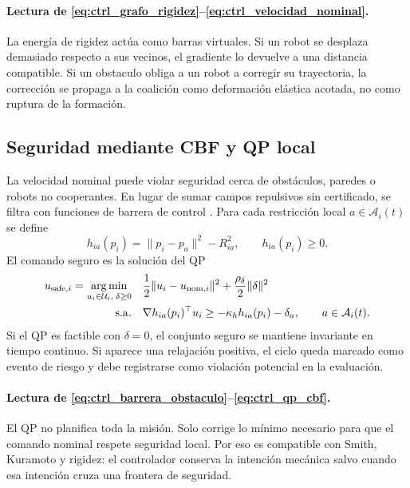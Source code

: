 \paragraph{Lectura de \eqref{eq:ctrl_grafo_rigidez}--\eqref{eq:ctrl_velocidad_nominal}.}
La energía de rigidez actúa como barras virtuales. Si un robot se desplaza demasiado
respecto a sus vecinos, el gradiente lo devuelve a una distancia compatible. Si un
obstaculo obliga a un robot a corregir su trayectoria, la corrección se propaga a la
coalición como deformación elástica acotada, no como ruptura de la formación.

\subsection{Seguridad mediante CBF y QP local}
\label{subsec:control-cbf}

La velocidad nominal puede violar seguridad cerca de obstáculos, paredes o robots no
cooperantes. En lugar de sumar campos repulsivos sin certificado, se filtra con
funciones de barrera de control \citep{ames2017cbf}. Para cada restricción local
$a\in\mathcal A_i(t)$ se define
\begin{equation}
  h_{ia}(p_i)
  =
  \|p_i-p_a\|^2-R_{ia}^{2},
  \qquad
  h_{ia}(p_i)\ge0 .
  \label{eq:ctrl_barrera_obstaculo}
\end{equation}
El comando seguro es la solución del QP
\begin{equation}
\begin{aligned}
  u_{\mathrm{safe},i}
  =
  \operatorname*{arg\,min}_{u_i\in\mathcal U_i,\;\delta\ge0}
  &\quad
  \frac12\|u_i-u_{\mathrm{nom},i}\|^2
  +
  \frac{\rho_\delta}{2}\|\delta\|^2\\
  \mathrm{s.a.}
  &\quad
  \nabla h_{ia}(p_i)^\top u_i
  \ge
  -\kappa_h h_{ia}(p_i)-\delta_a,
  \qquad a\in\mathcal A_i(t).
\end{aligned}
\label{eq:ctrl_qp_cbf}
\end{equation}
Si el QP es factible con $\delta=0$, el conjunto seguro se mantiene invariante en tiempo
continuo. Si aparece una relajación positiva, el ciclo queda marcado como evento de
riesgo y debe registrarse como violación potencial en la evaluación.

\paragraph{Lectura de \eqref{eq:ctrl_barrera_obstaculo}--\eqref{eq:ctrl_qp_cbf}.}
El QP no planifica toda la misión. Solo corrige lo mínimo necesario para que el comando
nominal respete seguridad local. Por eso es compatible con Smith, Kuramoto y rigidez: el
controlador conserva la intención mecánica salvo cuando esa intención cruza una frontera
de seguridad.

